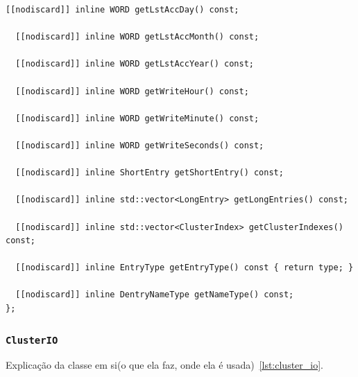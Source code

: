 \documentclass[
    12pt,				%
    oneside,   	        %
    a4paper,			%
    english,			%
    french,				%
    spanish,			%
    brazil,				%
    ]{pacotes/abntex2}
\begin{document}
\begin{lstlisting}[caption={Classe que abstrai entradas longas e curtas em uma única interface}, label={lst:dentry}]
  [[nodiscard]] inline WORD getLstAccDay() const;

  [[nodiscard]] inline WORD getLstAccMonth() const;

  [[nodiscard]] inline WORD getLstAccYear() const;

  [[nodiscard]] inline WORD getWriteHour() const;

  [[nodiscard]] inline WORD getWriteMinute() const;

  [[nodiscard]] inline WORD getWriteSeconds() const;

  [[nodiscard]] inline ShortEntry getShortEntry() const;

  [[nodiscard]] inline std::vector<LongEntry> getLongEntries() const;

  [[nodiscard]] inline std::vector<ClusterIndex> getClusterIndexes() const;

  [[nodiscard]] inline EntryType getEntryType() const { return type; }

  [[nodiscard]] inline DentryNameType getNameType() const;
};
\end{lstlisting}

\subsubsection{\texttt{ClusterIO}}
\label{subsubsec:cluster_io}

Explicação da classe em si(o que ela faz, onde ela é usada)~\ref{lst:cluster_io}.
\end{document}

